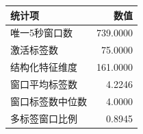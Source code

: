 \begin{tabular}{p{5.5cm}r}
\toprule
统计项 & 数值 \\
\midrule
唯一5秒窗口数 & 739.0000 \\
激活标签数 & 75.0000 \\
结构化特征维度 & 161.0000 \\
窗口平均标签数 & 4.2246 \\
窗口标签数中位数 & 4.0000 \\
多标签窗口比例 & 0.8945 \\
\bottomrule
\end{tabular}